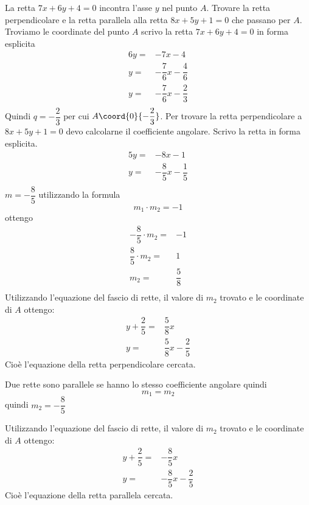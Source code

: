 	La retta $7x+6y+4=0$ incontra l'asse $y$ nel punto $A$. Trovare la retta perpendicolare e la retta parallela alla retta $8x+5y+1=0$ che passano per $A$.
	Troviamo le coordinate del punto $A$ scrivo la retta  $7x+6y+4=0$ in forma esplicita
	\begin{align*}
	6y=&-7x-4\\
	y=&-\dfrac{7}{6}x-\dfrac{4}{6}\\
	y=&-\dfrac{7}{6}x-\dfrac{2}{3}\\
	\end{align*}
	Quindi $q=-\dfrac{2}{3}$ per cui $A\coord{0}{-\dfrac{2}{3}}$. Per trovare la retta perpendicolare a $8x+5y+1=0$ devo calcolarne il coefficiente angolare.
	Scrivo la retta in forma esplicita.
		\begin{align*}
		5y=&-8x-1\\
		y=&-\dfrac{8}{5}x-\dfrac{1}{5}\\
		\end{align*}
	$m=-\dfrac{8}{5}$ utilizzando la formula \[m_1\cdot m_2=-1\] ottengo
	\begin{align*}
-\dfrac{8}{5}\cdot m_2=&-1\\
\dfrac{8}{5}\cdot m_2=&1\\
 m_2=&\dfrac{5}{8}\\
	\end{align*}
	Utilizzando l'equazione del fascio di rette, il valore di $m_2$ trovato e le coordinate di $A$ ottengo:
	\begin{align*}
	y+\dfrac{2}{5}=&\dfrac{5}{8}x\\
		y=&\dfrac{5}{8}x-\dfrac{2}{5}
	\end{align*}
	Cioè l'equazione della retta perpendicolare cercata.

	Due rette sono parallele se hanno lo stesso coefficiente angolare quindi \[m_1=m_2 \]
	quindi $m_2=-\dfrac{8}{5}$

	Utilizzando l'equazione del fascio di rette, il valore di $m_2$ trovato e le coordinate di $A$ ottengo:
		\begin{align*}
		y+\dfrac{2}{5}=&-\dfrac{8}{5}x\\
		y=&-\dfrac{8}{5}x-\dfrac{2}{5}
		\end{align*}
	Cioè l'equazione della retta parallela cercata.
	\begin{center}

\end{center}
